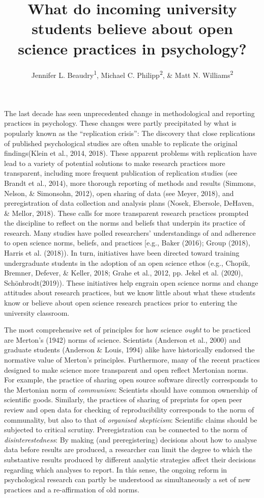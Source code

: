 \documentclass[
  man,mask,floatsintext]{apa6}
\affiliation{
\vspace{0.5cm}
\textsuperscript{1} Swinburne University of Technology\\\textsuperscript{2} Massey University}
\title{What do incoming university students believe about open science practices in psychology?}
\author{Jennifer L. Beaudry\textsuperscript{1}, Michael C. Philipp\textsuperscript{2}, \& Matt N. Williams\textsuperscript{2}}
\date{}
\begin{document}
\maketitle

The last decade has seen unprecedented change in methodological and reporting practices in psychology. These changes were partly precipitated by what is popularly known as the ``replication crisis'': The discovery that close replications of published psychological studies are often unable to replicate the original findings(Klein et al., 2014, 2018). These apparent problems with replication have lead to a variety of potential solutions to make research practices more transparent, including more frequent publication of replication studies (see Brandt et al., 2014), more thorough reporting of methods and results (Simmons, Nelson, \& Simonsohn, 2012), open sharing of data (see Meyer, 2018), and preregistration of data collection and analysis plans (Nosek, Ebersole, DeHaven, \& Mellor, 2018). These calls for more transparent research practices prompted the discipline to reflect on the norms and beliefs that underpin its practice of research. Many studies have polled researchers' understandings of and adherence to open science norms, beliefs, and practices {[}e.g., Baker (2016); Group (2018), Harris et al. (2018)). In turn, initiatives have been directed toward training undergraduate students in the adoption of an open science ethos (e.g., Chopik, Bremner, Defever, \& Keller, 2018; Grahe et al., 2012, pp. Jekel et al. (2020), Schönbrodt(2019)). These initiatives help engrain open science norms and change attitudes about research practices, but we know little about what these students know or believe about open science research practices prior to entering the university classroom.

The most comprehensive set of principles for how science \emph{ought} to be practiced are Merton's (1942) norms of science. Scientists (Anderson et al., 2000) and graduate students (Anderson \& Louis, 1994) alike have historically endorsed the normative value of Merton's principles. Furthermore, many of the recent practices designed to make science more transparent and open reflect Mertonian norms. For example, the practice of sharing open source software directly corresponds to the Mertonian norm of \emph{communism}: Scientists should have common ownership of scientific goods. Similarly, the practices of sharing of preprints for open peer review and open data for checking of reproducibility corresponds to the norm of communality, but also to that of \emph{organised skepticism}: Scientific claims should be subjected to critical scrutiny. Preregistration can be connected to the norm of \emph{disinterestedness}: By making (and preregistering) decisions about how to analyse data before results are produced, a researcher can limit the degree to which the substantive results produced by different analytic strategies affect their decisions regarding which analyses to report. In this sense, the ongoing reform in psychological research can partly be understood as simultaneously a set of new practices and a re-affirmation of old norms.
\end{document}
